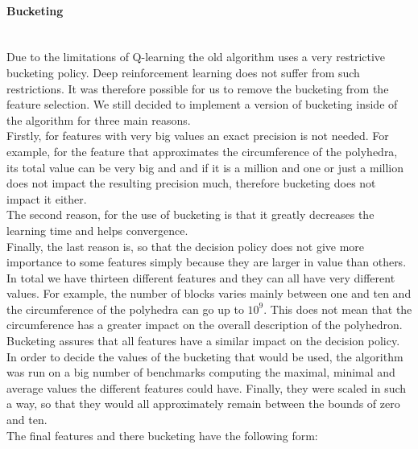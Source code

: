 \paragraph{Bucketing}\mbox{}\\
Due to the limitations of Q-learning the old algorithm uses a very restrictive bucketing policy. Deep reinforcement learning does not suffer from such restrictions. It was therefore possible for us to remove the bucketing from the feature selection. We still decided to implement a version of bucketing inside of the algorithm for three main reasons. \\
Firstly, for features with very big values an exact precision is not needed. For example, for the feature that approximates the circumference of the polyhedra, its total value can be very big and and if it is a million and one or just a million does not impact the resulting precision much, therefore bucketing does not impact it either. \\
The second reason, for the use of bucketing is that it greatly decreases the learning time and helps convergence. \\
Finally, the last reason is, so that the decision policy does not give more importance to some features simply because they are larger in value than others. In total we have thirteen different features and they can all have very different values. For example, the number of blocks varies mainly between one and ten and the circumference of the polyhedra can go up to $10^9$. This does not mean that the circumference has a greater impact on the overall description of the polyhedron. Bucketing assures that all features have a similar impact on the decision policy.\\
In order to decide the values of the bucketing that would be used,  the algorithm was run on a big number of benchmarks computing the maximal, minimal and average values the different features could have. Finally, they were scaled in such a way, so that they would all approximately remain between the bounds of zero and ten.\\
The final features and there bucketing have the following form:
